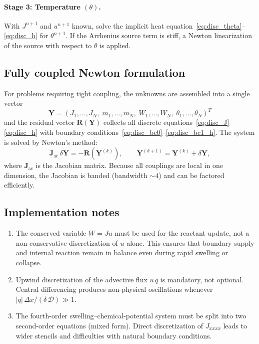 \documentclass[aps,pre,reprint,superscriptaddress,longbibliography,floatfix]{revtex4-2}
\newcommand{\Ds}{\mathcal{D}}
\begin{document}
\paragraph{Stage 3: Temperature $(\theta)$.}
With $J^{n+1}$ and $u^{n+1}$ known, solve the implicit heat equation~\eqref{eq:disc_theta}--\eqref{eq:disc_h} for $\theta^{n+1}$. If the Arrhenius source term is stiff, a Newton linearization of the source with respect to $\theta$ is applied.

\subsection{Fully coupled Newton formulation}

For problems requiring tight coupling, the unknowns are assembled into a single vector
\begin{equation}
  \bm{Y} = (J_1,\dots,J_N,\;m_1,\dots,m_N,\;W_1,\dots,W_N,\;\theta_1,\dots,\theta_N)^T
\end{equation}
and the residual vector $\bm{R}(\bm{Y})$ collects all discrete equations~\eqref{eq:disc_J}--\eqref{eq:disc_h} with boundary conditions~\eqref{eq:disc_bc0}--\eqref{eq:disc_bc1_h}. The system is solved by Newton's method:
\begin{equation}
  \bm{J}_\mathrm{ac}\,\delta\bm{Y} = -\bm{R}(\bm{Y}^{(k)}),
  \qquad
  \bm{Y}^{(k+1)} = \bm{Y}^{(k)} + \delta\bm{Y},
\end{equation}
where $\bm{J}_\mathrm{ac}$ is the Jacobian matrix. Because all couplings are local in one dimension, the Jacobian is banded (bandwidth $\sim 4$) and can be factored efficiently.

\subsection{Implementation notes}

\begin{enumerate}
  \item The conserved variable $W = Ju$ must be used for the reactant update, not a non-conservative discretization of $u$ alone. This ensures that boundary supply and internal reaction remain in balance even during rapid swelling or collapse.
  \item Upwind discretization of the advective flux $u\,q$ is mandatory, not optional. Central differencing produces non-physical oscillations whenever $|q|\,\Delta x / (\delta\,\Ds) \gg 1$.
  \item The fourth-order swelling--chemical-potential system must be split into two second-order equations (mixed form). Direct discretization of $J_{xxxx}$ leads to wider stencils and difficulties with natural boundary conditions.
\end{enumerate}
\end{document}
